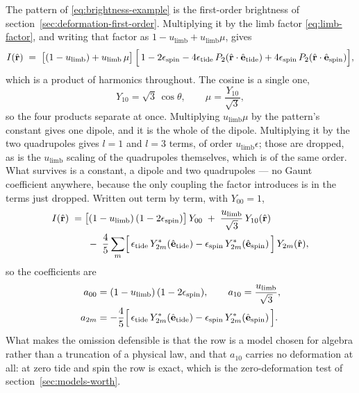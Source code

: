 The pattern of \eqref{eq:brightness-example} is the first-order brightness of
section~\ref{sec:deformation-first-order}.  Multiplying it by the limb factor
\eqref{eq:limb-factor}, and writing that factor as $1 - u_\text{limb} + u_\text{limb}\mu$, gives
\begin{equation}
  I(\hat{\mathbf r}) \;=\; \bigl[(1 - u_\text{limb}) + u_\text{limb}\,\mu\bigr]\,
  \Bigl[\,1 - 2\epsilon_\text{spin}
  - 4\epsilon_\text{tide}\,P_2(\hat{\mathbf r}\cdot\hat{\mathbf e}_\text{tide})
  + 4\epsilon_\text{spin}\,P_2(\hat{\mathbf r}\cdot\hat{\mathbf e}_\text{spin}) \Bigr] ,
  \label{eq:limb-pattern}
\end{equation}
which is a product of harmonics throughout.  The cosine is a single one,
\begin{equation}
  Y_{10} = \sqrt3\,\cos\theta , \qquad \mu = \frac{Y_{10}}{\sqrt3} ,
  \label{eq:mu-as-y10}
\end{equation}
so the four products separate at once.  Multiplying $u_\text{limb}\mu$ by the pattern's constant
gives one dipole, and it is the whole of the dipole.  Multiplying it by the two quadrupoles gives
$l = 1$ and $l = 3$ terms, of order $u_\text{limb}\epsilon$; those are dropped, as is the
$u_\text{limb}$ scaling of the quadrupoles themselves, which is of the same order.  What survives
is a constant, a dipole and two quadrupoles --- no Gaunt coefficient anywhere, because the only
coupling the factor introduces is in the terms just dropped.  Written out term by term, with
$Y_{00} = 1$,
\begin{equation}
  \begin{aligned}
    I(\hat{\mathbf r}) \;=\;& \bigl[(1-u_\text{limb})\,(1-2\epsilon_\text{spin})\bigr]\,Y_{00}
      \;+\; \frac{u_\text{limb}}{\sqrt3}\,Y_{10}(\hat{\mathbf r}) \\
    &\;-\; \frac{4}{5}\sum_{m}\Bigl[\,\epsilon_\text{tide}\,Y_{2m}^*(\hat{\mathbf e}_\text{tide})
      - \epsilon_\text{spin}\,Y_{2m}^*(\hat{\mathbf e}_\text{spin})\,\Bigr]\,Y_{2m}(\hat{\mathbf r}) ,
  \end{aligned}
  \label{eq:limb-expansion}
\end{equation}
so the coefficients are
\begin{equation}
  \begin{aligned}
    a_{00} &= (1-u_\text{limb})\,(1-2\epsilon_\text{spin}) , \qquad
    a_{10} = \frac{u_\text{limb}}{\sqrt3} , \\
    a_{2m} &= -\frac{4}{5}\Bigl[\,\epsilon_\text{tide}\,Y_{2m}^*(\hat{\mathbf e}_\text{tide})
    - \epsilon_\text{spin}\,Y_{2m}^*(\hat{\mathbf e}_\text{spin})\,\Bigr] .
  \end{aligned}
  \label{eq:limb-coefficients}
\end{equation}
What makes the omission defensible is that the row is a model chosen for algebra rather than a
truncation of a physical law, and that $a_{10}$ carries no deformation at all: at zero tide and
spin the row is exact, which is the zero-deformation test of
section~\ref{sec:models-worth}.

